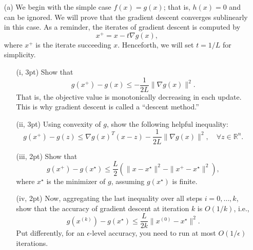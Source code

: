\documentclass{article}
\theoremstyle{remark}
\theoremstyle{definition}
\begin{document}
\begin{enumerate}
\item[(a)]
We begin with the simple case $f(x)=g(x)$; that is, $h(x)=0$ and can be ignored.
We will prove that the gradient descent converges sublinearly in this case.
As a reminder, the iterates of gradient descent is computed by
\begin{equation}
x^{+} = x - t \nabla g(x), \label{eq:q3:1}
\end{equation}
where $x^{+}$ is the iterate succeeding $x$.  Henceforth, we will set $t=1/L$
for simplicity. 

    \begin{enumerate}
    \item[(i, 3pt)] Show that 
    \[
            g(x^+)-g(x) \leq -\frac{1}{2L}\|\nabla g(x)\|^2.
    \]
    That is, the objective value is monotonically decreasing in each update.
    This is why gradient descent is called a ``descent method.''
    \item[(ii, 3pt)] Using convexity of $g$, show the following helpful
      inequality: 
    \[
            g(x^+) - g(z) \leq \nabla g(x)^T(x-z) - \frac{1}{2L}\|\nabla g(x)\|^2,\quad\forall z\in\mathbb{R}^n.
    \]
    \item[(iii, 2pt)] Show that 
    \[
            g(x^+)-g(x^\star) \leq \frac{L}{2}\left(\|x-x^\star\|^2-\|x^+-x^\star\|^2\right),
    \]
    where $x^{\star}$ is the minimizer of $g$, assuming $g(x^\star)$ is finite.
    \item[(iv, 2pt)] Now, aggregating the last inequality over all steps
      $i=0,\ldots,k$, show that the accuracy of gradient descent at iteration
      $k$ is $O(1/k)$, i.e.,   
    \[
            g(x^{(k)}) - g(x^\star) \leq \frac{L}{2k}\|x^{(0)}-x^\star\|^2.
    \]
    Put differently, for an $\epsilon$-level accuracy, you need to run at most $O(1/\epsilon)$ iterations.
    \end{enumerate}


\end{enumerate}
\end{document}
